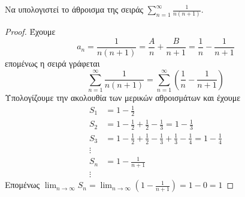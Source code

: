 \documentclass[main.tex]{subfiles}
\begin{document}
\begin{examples}
\item {}
    \begin{enumerate}
        \item Να υπολογιστεί το άθροισμα της σειράς $ \sum_{n=1}^{\infty} 
            \frac{1}{n(n+1)} $.
            \begin{proof}
            \item 
                Έχουμε
                \[
                    a_{n} = \frac{1}{n(n+1)} = \frac{A}{n} + \frac{B}{n+1} = 
                    \frac{1}{n} - \frac{1}{n+1} 
                \]
                επομένως η σειρά γράφεται
                \[
                    \sum_{n=1}^{\infty} \frac{1}{n(n+1)} = 
                    \sum_{n=1}^{\infty} \left(\frac{1}{n} - \frac{1}{n+1}\right) 
                \] 
                Υπολογίζουμε την ακολουθία των μερικών αθροισμάτων και έχουμε
                \begin{align*}
                    S_{1} &= 1- \frac{1}{2} \\
                    S_{2} &= 1- \frac{1}{2} + \frac{1}{2} - \frac{1}{3} = 
                    1 - \frac{1}{3}  \\
                    S_{3} &=  1- \frac{1}{2} + \frac{1}{2} - \frac{1}{3} + 
                    \frac{1}{3} - \frac{1}{4} = 1 - \frac{1}{4}  \\
                    \vdots \\
                    S_{n} &= 1 - \frac{1}{n+1} \\
                    \vdots
                \end{align*}
            Επομένως $ \lim_{n \to \infty} S_{n} = 
            \lim_{n \to \infty} \left(1 - \frac{1}{n+1}\right) = 1 - 0 = 1 $
        \end{proof}


\end{enumerate}
\end{examples}
\end{document}
